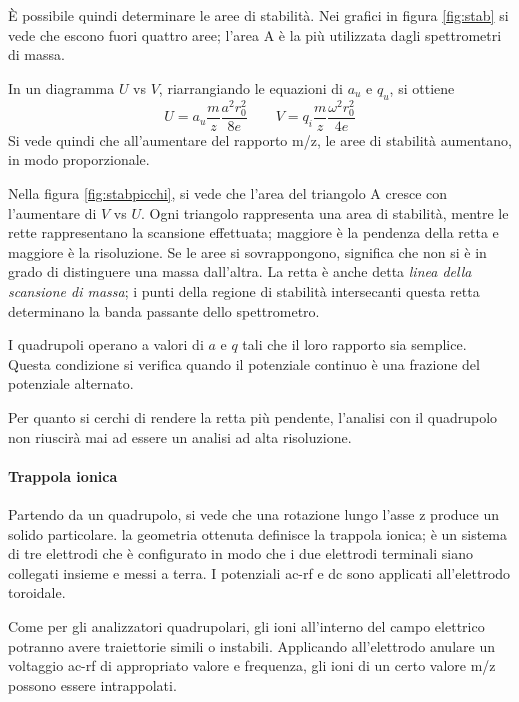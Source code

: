 È possibile quindi determinare le aree di stabilità.
Nei grafici in figura \ref{fig:stab} si vede che escono fuori quattro aree; l'area A è la più utilizzata dagli spettrometri di massa.

In un diagramma $U$ vs $V$, riarrangiando le equazioni di $a_u$ e $q_u$, si ottiene
\[
U = a_u \frac{m}{z} \frac{a^2 r_0^2}{8e} \qquad V = q_i \frac{m}{z} \frac{\omega^2 r_0^2}{4 e}
\]
Si vede quindi che all'aumentare del rapporto m/z, le aree di stabilità aumentano, in modo proporzionale.


Nella figura \ref{fig:stabpicchi}, si vede che l'area del triangolo A cresce con l'aumentare di $V$ vs $U$.
Ogni triangolo rappresenta una area di stabilità, mentre le rette rappresentano la scansione effettuata; maggiore è la pendenza della retta e maggiore è la risoluzione.
Se le aree si sovrappongono, significa che non si è in grado di distinguere una massa dall'altra.
La retta è anche detta \emph{linea della scansione di massa}; i punti della regione di stabilità intersecanti questa retta determinano la banda passante dello spettrometro.


I quadrupoli operano a valori di $a$ e $q$ tali che il loro rapporto sia semplice.
Questa condizione si verifica quando il potenziale continuo è una frazione del potenziale alternato.

Per quanto si cerchi di rendere la retta più pendente, l'analisi con il quadrupolo non riuscirà mai ad essere un analisi ad alta risoluzione.


\paragraph{Trappola ionica}
Partendo da un quadrupolo, si vede che una rotazione lungo l'asse z produce un solido particolare.
la geometria ottenuta definisce la trappola ionica; è un sistema di tre elettrodi che è configurato in modo che i due elettrodi terminali siano collegati insieme e messi a terra.
I potenziali ac-rf e dc sono applicati all'elettrodo toroidale.


Come per gli analizzatori quadrupolari, gli ioni all'interno del campo elettrico potranno avere traiettorie simili o instabili.
Applicando all'elettrodo anulare un voltaggio ac-rf di appropriato valore e frequenza, gli ioni di un certo valore m/z possono essere intrappolati.

